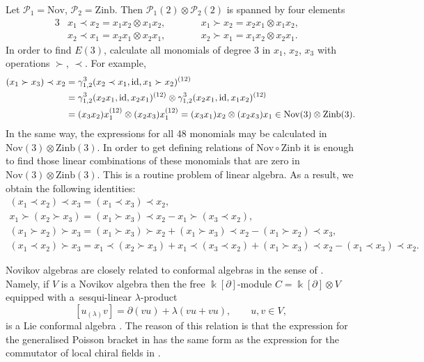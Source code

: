 \documentclass[11pt]{article}
\numberwithin{equation}{section}
\numberwithin{equation}{section}
\def\Nov{\mathrm{Nov}}
\def\Zinb{\mathrm{Zinb}}
\def\id {\mathop {\fam 0 id}\nolimits}
\begin{document}
\begin{Example}\label{exmp:Nov-Zinb}
Let $\mathcal P_1=\Nov$, $\mathcal P_2=\Zinb$.
Then $\mathcal P_1(2)\otimes \mathcal P_2(2)$ is spanned by four elements
\begin{alignat*}{3}
& x_1\prec x_2 = x_1x_2\otimes x_1x_2,
 \qquad &&
 x_1\succ x_2 = x_2x_1\otimes x_1x_2, &
 \\
& x_2\prec x_1 = x_2x_1\otimes x_2x_1,
 \qquad &&
 x_2\succ x_1 = x_1x_2\otimes x_2x_1. &
\end{alignat*}
In order to find $E(3)$, calculate all monomials of degree 3 in $x_1$, $x_2$, $x_3$
with operations $\succ$, $\prec$. For example,
%
\begin{align*}
 (x_1\succ x_3)\prec x_2 &= \gamma^3_{1,2} (x_2\prec x_1, \id, x_1\succ x_2)^{(12)}
 \\
 &=
 \gamma^3_{1,2}(x_2x_1, \id, x_2x_1)^{(12)}\otimes \gamma^3_{1,2}(x_2x_1, \id, x_1x_2)^{(12)}
 \\
& =
(x_3x_2)x_1^{(12)}\otimes (x_2x_3)x_1^{(12)}
=
(x_3x_1)x_2\otimes (x_2x_3)x_1 \in \Nov(3)\otimes \Zinb(3).
\end{align*}
%
In the same way, the expressions for all 48 monomials may be calculated
in $\Nov(3)\otimes \Zinb(3)$. In order to get defining relations
of $\Nov\circ \Zinb$ it is enough to find those linear combinations
of these monomials that are zero in $\Nov(3)\otimes \Zinb(3)$.
This is a routine problem of linear algebra.
As a result, we obtain the following identities:
%
\begin{gather}
(x_1\prec x_2)\prec x_3=(x_1\prec x_3)\prec x_2,\nonumber\\
x_1\succ (x_2\succ x_3) = (x_1\succ x_3)\prec x_2-x_1\succ (x_3\prec x_2),\nonumber\\
(x_1\succ x_2)\succ x_3=(x_1\succ x_3)\succ x_2 +(x_1\succ x_3)\prec x_2-(x_1\succ x_2)\prec x_3, \label{eq:pre-Novikov}\\
%
(x_1\prec x_2)\succ x_3=x_1\prec (x_2\succ x_3)+x_1\prec (x_3\prec x_2)
 +(x_1\succ x_3)\prec x_2-(x_1\prec x_3)\prec x_2.\nonumber
\end{gather}
\end{Example}

\begin{Remark}%
Novikov algebras are closely
related to conformal algebras in the sense
of \cite{Kac:VAforbeginners}.
Namely, if $V$ is a Novikov algebra then
the free $\Bbbk [\partial ]$-module $C=\Bbbk[\partial ]\otimes V$
equipped with a~sesqui-linear $\lambda $-product
\[
[u{}_{(\lambda )} v] = \partial (vu) + \lambda (vu + vu),
\qquad u,v\in V,
\]
is a Lie conformal algebra \cite{Xu1999}. The reason of this
relation is that the expression for the generalised Poisson
bracket in \cite{BN1985} has the same form as the expression
for the commutator of local chiral fields in \cite{Kac:VAforbeginners}.
\end{Remark}
\end{document}
